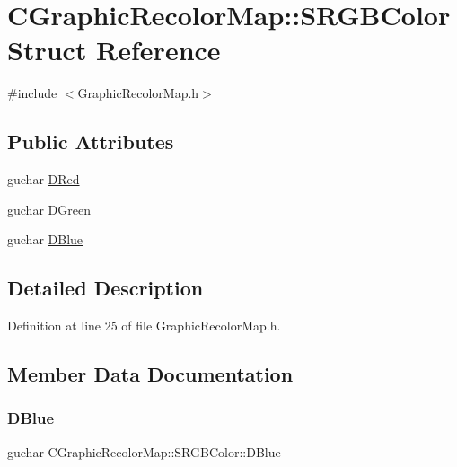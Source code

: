 \hypertarget{structCGraphicRecolorMap_1_1SRGBColor}{}\section{C\+Graphic\+Recolor\+Map\+:\+:S\+R\+G\+B\+Color Struct Reference}
\label{structCGraphicRecolorMap_1_1SRGBColor}


{\ttfamily \#include $<$Graphic\+Recolor\+Map.\+h$>$}

\subsection*{Public Attributes}
\begin{DoxyCompactItemize}
\item 
guchar \hyperlink{structCGraphicRecolorMap_1_1SRGBColor_a8562e30b0e4489fdde36eddd19c7de40}{D\+Red}
\item 
guchar \hyperlink{structCGraphicRecolorMap_1_1SRGBColor_aff20fa0c0e6037339a1232cb2b899774}{D\+Green}
\item 
guchar \hyperlink{structCGraphicRecolorMap_1_1SRGBColor_a467e6bbee5ed0ce98b038ef429d222df}{D\+Blue}
\end{DoxyCompactItemize}


\subsection{Detailed Description}


Definition at line 25 of file Graphic\+Recolor\+Map.\+h.



\subsection{Member Data Documentation}
\hypertarget{structCGraphicRecolorMap_1_1SRGBColor_a467e6bbee5ed0ce98b038ef429d222df}{}\label{structCGraphicRecolorMap_1_1SRGBColor_a467e6bbee5ed0ce98b038ef429d222df} 
\subsubsection{\texorpdfstring{D\+Blue}{DBlue}}
{\footnotesize\ttfamily guchar C\+Graphic\+Recolor\+Map\+::\+S\+R\+G\+B\+Color\+::\+D\+Blue}



